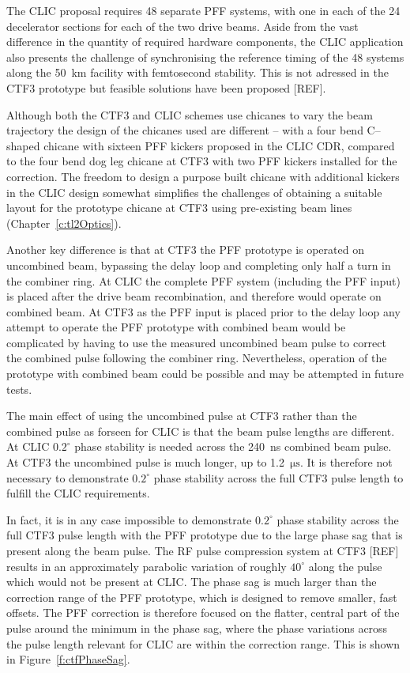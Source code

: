 The CLIC proposal requires 48 separate PFF systems, with one in each of the 24 decelerator sections for each of the two drive beams. Aside from the vast difference in the quantity of required hardware components, the CLIC application also presents the challenge of synchronising the reference timing of the 48 systems along the 50~km facility with femtosecond stability. This is not adressed in the CTF3 prototype but feasible solutions have been proposed [REF].

Although both the CTF3 and CLIC schemes use chicanes to vary the beam trajectory the design of the chicanes used are different -- with a four bend C--shaped chicane with sixteen PFF kickers proposed in the CLIC CDR, compared to the four bend dog leg chicane at CTF3 with two PFF kickers installed for the correction. The freedom to design a purpose built chicane with additional kickers in the CLIC design somewhat simplifies the challenges of obtaining a suitable layout for the prototype chicane at CTF3 using pre-existing beam lines (Chapter~\ref{c:tl2Optics}).

Another key difference is that at CTF3 the PFF prototype is operated on uncombined beam, bypassing the delay loop and completing only half a turn in the combiner ring. At CLIC the complete PFF system (including the PFF input) is placed after the drive beam recombination, and therefore would operate on combined beam. At CTF3 as the PFF input is placed prior to the delay loop any attempt to operate the PFF prototype with combined beam would be complicated by having to use the measured uncombined beam pulse to correct the combined pulse following the combiner ring. Nevertheless, operation of the prototype with combined beam could be possible and may be attempted in future tests.

The main effect of using the uncombined pulse at CTF3 rather than the combined pulse as forseen for CLIC is that the beam pulse lengths are different. At CLIC \(0.2^\circ\) phase stability is needed across the 240~ns combined beam pulse. At CTF3 the uncombined pulse is much longer, up to 1.2~\(\mathrm{\mu s}\). It is therefore not necessary to demonstrate \(0.2^\circ\) phase stability across the full CTF3 pulse length to fulfill the CLIC requirements.

In fact, it is in any case impossible to demonstrate \(0.2^\circ\) phase stability across the full CTF3 pulse length with the PFF prototype due to the large phase sag that is present along the beam pulse. The RF pulse compression system at CTF3 [REF] results in an approximately parabolic variation of roughly \(40^\circ\) along the pulse which would not be present at CLIC. The phase sag is much larger than the correction range of the PFF prototype, which is designed to remove smaller, fast offsets. The PFF correction is therefore focused on the flatter, central part of the pulse around the minimum in the phase sag, where the phase variations across the pulse length relevant for CLIC are within the correction range. This is shown in Figure~\ref{f:ctfPhaseSag}.

